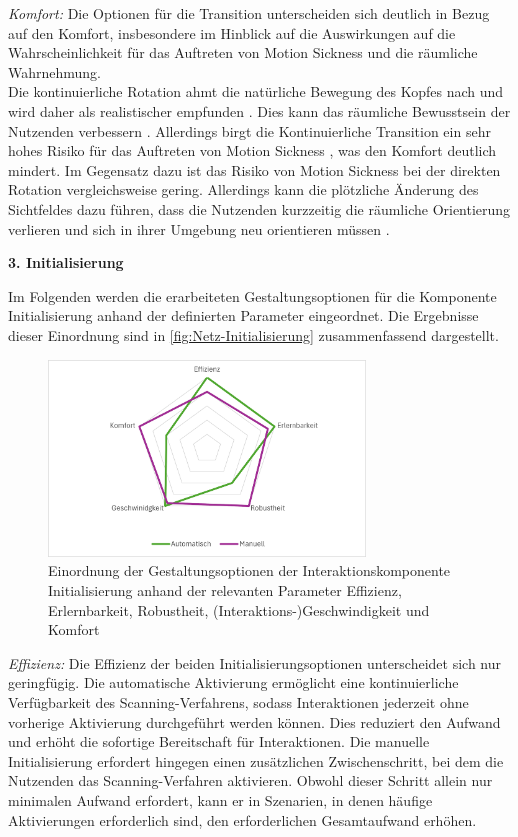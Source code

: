 \textit{Komfort:}
Die Optionen für die Transition unterscheiden sich deutlich in Bezug auf den Komfort, insbesondere im Hinblick auf die Auswirkungen auf die Wahrscheinlichkeit für das Auftreten von Motion Sickness und die räumliche Wahrnehmung.\\
Die kontinuierliche Rotation ahmt die natürliche Bewegung des Kopfes nach und wird daher als realistischer empfunden \citep{8797722}. Dies kann das räumliche Bewusstsein der Nutzenden verbessern \citep{10.1145/3441852.3471230}. Allerdings birgt die Kontinuierliche Transition ein sehr hohes Risiko für das Auftreten von Motion Sickness \citep{10.1007/s10055-020-00425-x, 8797722}, was den Komfort deutlich mindert.
Im Gegensatz dazu ist das Risiko von Motion Sickness bei der direkten Rotation vergleichsweise gering. Allerdings kann die plötzliche Änderung des Sichtfeldes dazu führen, dass die Nutzenden kurzzeitig die räumliche Orientierung verlieren und sich in ihrer Umgebung neu orientieren müssen \citep{10.1145/3441852.3471230}. 

\textbf{3. Initialisierung} 

Im Folgenden werden die erarbeiteten Gestaltungsoptionen für die Komponente Initialisierung anhand der definierten Parameter eingeordnet. Die Ergebnisse dieser Einordnung sind in \autoref{fig:Netz-Initialisierung} zusammenfassend dargestellt. 

\begin{figure}[tbh]
    \centering
    \includegraphics[width=0.75\textwidth]{images/Netzdiagramm-Initialisierung.png}
    \caption{Einordnung der Gestaltungsoptionen der Interaktionskomponente Initialisierung anhand der relevanten Parameter Effizienz, Erlernbarkeit, Robustheit, (Interaktions-)Geschwindigkeit und Komfort}
    \label{fig:Netz-Initialisierung}
\end{figure}

\textit{Effizienz:}
Die Effizienz der beiden Initialisierungsoptionen unterscheidet sich nur geringfügig. Die automatische Aktivierung ermöglicht eine kontinuierliche Verfügbarkeit des Scanning-Verfahrens, sodass Interaktionen jederzeit ohne vorherige Aktivierung durchgeführt werden können. Dies reduziert den Aufwand und erhöht die sofortige Bereitschaft für Interaktionen. Die manuelle Initialisierung erfordert hingegen einen zusätzlichen Zwischenschritt, bei dem die Nutzenden das Scanning-Verfahren aktivieren. Obwohl dieser Schritt allein nur minimalen Aufwand erfordert, kann er in Szenarien, in denen häufige Aktivierungen erforderlich sind, den erforderlichen Gesamtaufwand erhöhen. 


